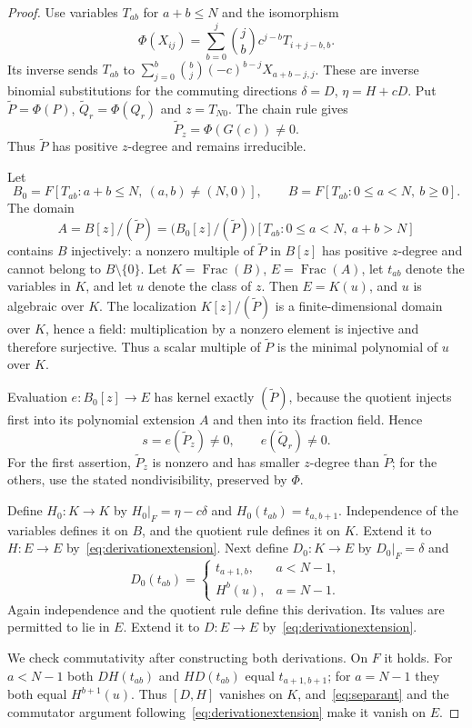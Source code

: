 \documentclass{article}
\newcommand{\Frac}{\operatorname{Frac}}
\begin{document}
\begin{proof}
Use variables $T_{ab}$ for $a+b\leq N$ and the isomorphism
\[
 \Phi(X_{ij})=\sum_{b=0}^j\binom jb c^{j-b}T_{i+j-b,b}.
 \tag{4.2}\label{eq:directionchange}
\]
Its inverse sends $T_{ab}$ to $\sum_{j=0}^b\binom bj(-c)^{b-j}X_{a+b-j,j}$. These are inverse binomial substitutions for the commuting directions $\delta=D$, $\eta=H+cD$. Put $\widetilde P=\Phi(P)$, $\widetilde Q_r=\Phi(Q_r)$ and $z=T_{N0}$. The chain rule gives
\[
 \widetilde P_z=\Phi(G(c))\ne0.
\]
Thus $\widetilde P$ has positive $z$-degree and remains irreducible.

Let
\[
 B_0=F[T_{ab}:a+b\leq N,\ (a,b)\ne(N,0)],\qquad
 B=F[T_{ab}:0\leq a<N,\ b\geq0].
\]
The domain
\[
 A=B[z]/(\widetilde P)
 =\bigl(B_0[z]/(\widetilde P)\bigr)
 [T_{ab}:0\leq a<N,\ a+b>N]
\]
contains $B$ injectively: a nonzero multiple of $\widetilde P$ in $B[z]$ has positive $z$-degree and cannot belong to $B\setminus\{0\}$. Let $K=\Frac(B)$, $E=\Frac(A)$, let $t_{ab}$ denote the variables in $K$, and let $u$ denote the class of $z$. Then $E=K(u)$, and $u$ is algebraic over $K$. The localization $K[z]/(\widetilde P)$ is a finite-dimensional domain over $K$, hence a field: multiplication by a nonzero element is injective and therefore surjective. Thus a scalar multiple of $\widetilde P$ is the minimal polynomial of $u$ over $K$.

Evaluation $e:B_0[z]\to E$ has kernel exactly $(\widetilde P)$, because the quotient injects first into its polynomial extension $A$ and then into its fraction field. Hence
\[
 s=e(\widetilde P_z)\ne0,\qquad e(\widetilde Q_r)\ne0.
 \tag{4.3}\label{eq:separant}
\]
For the first assertion, $\widetilde P_z$ is nonzero and has smaller $z$-degree than $\widetilde P$; for the others, use the stated nondivisibility, preserved by $\Phi$.

Define $H_0:K\to K$ by $H_0|_F=\eta-c\delta$ and $H_0(t_{ab})=t_{a,b+1}$. Independence of the variables defines it on $B$, and the quotient rule defines it on $K$. Extend it to $H:E\to E$ by~\eqref{eq:derivationextension}. Next define $D_0:K\to E$ by $D_0|_F=\delta$ and
\[
 D_0(t_{ab})=
 \begin{cases}t_{a+1,b},&a<N-1,\\ H^b(u),&a=N-1.\end{cases}
 \tag{4.4}\label{eq:constructD}
\]
Again independence and the quotient rule define this derivation. Its values are permitted to lie in $E$. Extend it to $D:E\to E$ by~\eqref{eq:derivationextension}.

We check commutativity after constructing both derivations. On $F$ it holds. For $a<N-1$ both $DH(t_{ab})$ and $HD(t_{ab})$ equal $t_{a+1,b+1}$; for $a=N-1$ they both equal $H^{b+1}(u)$. Thus $[D,H]$ vanishes on $K$, and~\eqref{eq:separant} and the commutator argument following~\eqref{eq:derivationextension} make it vanish on $E$.


\end{proof}
\end{document}
